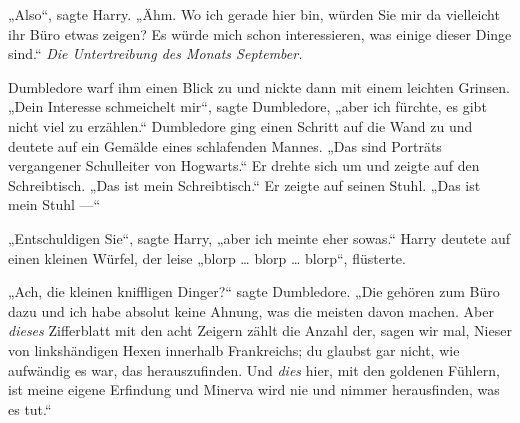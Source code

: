 „Also“, sagte Harry. „Ähm. Wo ich gerade hier bin, würden Sie mir da vielleicht ihr Büro etwas zeigen? Es würde mich schon interessieren, was einige dieser Dinge sind.“ \emph{Die Untertreibung des Monats September.}

Dumbledore warf ihm einen Blick zu und nickte dann mit einem leichten Grinsen.
„Dein Interesse schmeichelt mir“, sagte Dumbledore, „aber ich fürchte, es gibt nicht viel zu erzählen.“ Dumbledore ging einen Schritt auf die Wand zu und deutete auf ein Gemälde eines schlafenden Mannes.
„Das sind Porträts vergangener Schulleiter von Hogwarts.“ Er drehte sich um und zeigte auf den Schreibtisch.
„Das ist mein Schreibtisch.“ Er zeigte auf seinen Stuhl.
„Das ist mein Stuhl —“

„Entschuldigen Sie“, sagte Harry, „aber ich meinte eher sowas.“ Harry deutete auf einen kleinen Würfel, der leise „blorp … blorp … blorp“, flüsterte.

„Ach, die kleinen kniffligen Dinger?“ sagte Dumbledore.
„Die gehören zum Büro dazu und ich habe absolut keine Ahnung, was die meisten davon machen. Aber \emph{dieses} Zifferblatt mit den acht Zeigern zählt die Anzahl der, sagen wir mal, Nieser von linkshändigen Hexen innerhalb Frankreichs; du glaubst gar nicht, wie aufwändig es war, das herauszufinden. Und \emph{dies} hier, mit den goldenen Fühlern, ist meine eigene Erfindung und Minerva wird nie und nimmer herausfinden, was es tut.“


